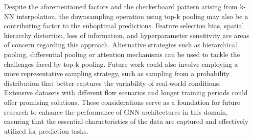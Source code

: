 Despite the aforementioned factors and the checkerboard pattern arising from k-NN interpolation, the downsampling operation using top-k pooling may also be a contributing factor to the suboptimal predictions. Feature selection bias, spatial hierarchy distortion, loss of information, and hyperparameter sensitivity are areas of concern regarding this approach. Alternative strategies such as hierarchical pooling, differential pooling or attention mechanisms can be used to tackle the challenges faced by top-k pooling. Future work could also involve employing a more representative sampling strategy, such as sampling from a probability distribution that better captures the variability of real-world conditions. Extensive datasets with different flow scenarios and longer training periods could offer promising solutions. These considerations serve as a foundation for future research to enhance the performance of GNN architectures in this domain, ensuring that the essential characteristics of the data are captured and effectively utilized for prediction tasks.
